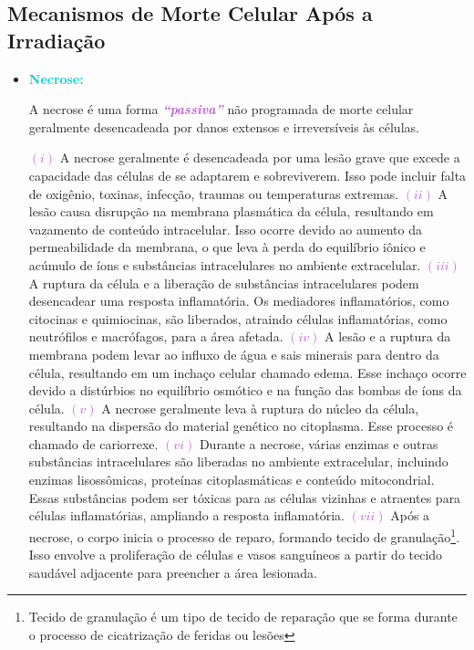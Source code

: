 \documentclass[11pt,a4paper]{article}
\begin{document}
\subsection*{Mecanismos de Morte Celular Após a Irradiação}

	\begin{itemize}[label=\textcolor{CarnationPink}{$\blacktriangleright$}]
		\item \textcolor{DarkTurquoise}{\LobsterTwo\Large\textbf{Necrose:}}
		
		A necrose é uma forma \textcolor{MediumOrchid}{\textbf{\textit{``passiva''}}} não programada de morte celular geralmente desencadeada por danos extensos e irreversíveis às células.

		\textcolor{MediumOrchid}{$(i)$} A necrose geralmente é desencadeada por uma lesão  grave que excede a capacidade das células de se adaptarem e sobreviverem. Isso pode incluir falta de oxigênio, toxinas, infecção, traumas ou temperaturas extremas. \textcolor{MediumOrchid}{$(ii)$} A lesão causa disrupção na membrana plasmática da célula, resultando em vazamento de conteúdo intracelular. Isso ocorre devido ao aumento da permeabilidade da membrana, o que leva à perda do equilíbrio iônico e acúmulo de íons e substâncias intracelulares no ambiente extracelular. \textcolor{MediumOrchid}{$(iii)$} A ruptura da célula e a liberação de substâncias intracelulares podem desencadear uma resposta inflamatória. Os mediadores inflamatórios, como citocinas e quimiocinas, são liberados, atraindo células inflamatórias, como neutrófilos e macrófagos, para a área afetada. \textcolor{MediumOrchid}{$(iv)$} A lesão e a ruptura da membrana podem levar ao influxo de água e sais minerais para dentro da célula, resultando em um inchaço celular chamado edema. Esse inchaço ocorre devido a distúrbios no equilíbrio osmótico e na função das bombas de íons da célula. \textcolor{MediumOrchid}{$(v)$} A necrose geralmente leva à ruptura do núcleo da célula, resultando na dispersão do material genético no citoplasma. Esse processo é chamado de cariorrexe. \textcolor{MediumOrchid}{$(vi)$}  Durante a necrose, várias enzimas e outras substâncias intracelulares são liberadas no ambiente extracelular, incluindo enzimas lisossômicas, proteínas citoplasmáticas e conteúdo mitocondrial. Essas substâncias podem ser tóxicas para as células vizinhas e atraentes para células inflamatórias, ampliando a resposta inflamatória. \textcolor{MediumOrchid}{$(vii)$} Após a necrose, o corpo inicia o processo de reparo, formando tecido de granulação\footnote{Tecido de granulação é um tipo de tecido de reparação que se forma durante o processo de cicatrização de feridas ou lesões}. Isso envolve a proliferação de células e vasos sanguíneos a partir do tecido saudável adjacente para preencher a área lesionada.
		


\end{itemize}
\end{document}
